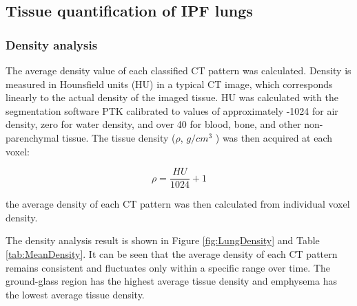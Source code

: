 
\subsection{Tissue quantification of IPF lungs} \label{TissueQuantification}
\subsubsection{Density analysis}
The average density value of each classified CT pattern was calculated. Density is measured in Hounsfield units (HU) in a typical CT image, which corresponds linearly to the actual density of the imaged tissue. HU was calculated with the segmentation software PTK calibrated to values of approximately -1024 for air density, zero for water density, and over 40 for blood, bone, and other non-parenchymal tissue. The tissue density ($\rho$, $g/cm^3$ ) was then acquired at each voxel:

\begin{equation}
\rho = \frac{HU}{1024} + 1
\end{equation}

\noindent the average density of each CT pattern was then calculated from individual voxel density.

The density analysis result is shown in Figure \ref{fig:LungDensity} and Table \ref{tab:MeanDensity}. It can be seen that the average density of each CT pattern remains consistent and fluctuates only within a specific range over time. The ground-glass region has the highest average tissue density and emphysema has the lowest average tissue density. 

